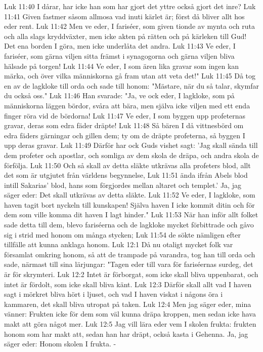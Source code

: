 Luk 11:40  I dårar, har icke han som har gjort det yttre också gjort det inre?
Luk 11:41  Given fastmer såsom allmosa vad inuti kärlet är; först då bliver allt hos eder rent.
Luk 11:42  Men ve eder, I fariséer, som given tionde av mynta och ruta och alla slags kryddväxter, men icke akten på rätten och på kärleken till Gud! Det ena borden I göra, men icke underlåta det andra.
Luk 11:43  Ve eder, I fariséer, som gärna viljen sitta främst i synagogorna och gärna viljen bliva hälsade på torgen!
Luk 11:44  Ve eder, I som ären lika gravar som ingen kan märka, och över vilka människorna gå fram utan att veta det!"
Luk 11:45  Då tog en av de lagkloke till orda och sade till honom: "Mästare, när du så talar, skymfar du också oss."
Luk 11:46  Han svarade: "Ja, ve ock eder, I lagkloke, som på människorna läggen bördor, svåra att bära, men själva icke viljen med ett enda finger röra vid de bördorna!
Luk 11:47  Ve eder, I som byggen upp profeternas gravar, deras som edra fäder dräpte!
Luk 11:48  Så bären I då vittnesbörd om edra fäders gärningar och gillen dem; ty om de dräpte profeterna, så byggen I upp deras gravar.
Luk 11:49  Därför har ock Guds vishet sagt: 'Jag skall sända till dem profeter och apostlar, och somliga av dem skola de dräpa, och andra skola de förfölja.
Luk 11:50  Och så skall av detta släkte utkrävas alla profeters blod, allt det som är utgjutet från världens begynnelse,
Luk 11:51  ända ifrån Abels blod intill Sakarias' blod, hans som förgjordes mellan altaret och templet.' Ja, jag säger eder: Det skall utkrävas av detta släkte.
Luk 11:52  Ve eder, I lagkloke, som haven tagit bort nyckeln till kunskapen! Själva haven I icke kommit ditin och för dem som ville komma dit haven I lagt hinder."
Luk 11:53  När han inför allt folket sade detta till dem, blevo fariséerna och de lagkloke mycket förbittrade och gåvo sig i strid med honom om många stycken;
Luk 11:54  de sökte nämligen efter tillfälle att kunna anklaga honom.
Luk 12:1  Då nu otaligt mycket folk var församlat omkring honom, så att de trampade på varandra, tog han till orda och sade, närmast till sina lärjungar: "Tagen eder till vara för fariséernas surdeg, det är för skrymteri.
Luk 12:2  Intet är förborgat, som icke skall bliva uppenbarat, och intet är fördolt, som icke skall bliva känt.
Luk 12:3  Därför skall allt vad I haven sagt i mörkret bliva hört i ljuset, och vad I haven viskat i någons öra i kammaren, det skall bliva utropat på taken.
Luk 12:4  Men jag säger eder, mina vänner: Frukten icke för dem som väl kunna dräpa kroppen, men sedan icke hava makt att göra något mer.
Luk 12:5  Jag vill lära eder vem I skolen frukta: frukten honom som har makt att, sedan han har dräpt, också kasta i Gehenna. Ja, jag säger eder: Honom skolen I frukta. -
